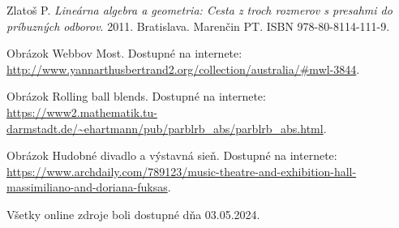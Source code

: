 \documentclass[12pt, twoside]{book}
\theoremstyle{definition}
\begin{document}
\begin{thebibliography}{99}
 Zlatoš P. \textit{Lineárna algebra a geometria: Cesta z troch rozmerov s presahmi do príbuzných odborov}. 2011. Bratislava. Marenčin PT. ISBN 978-80-8114-111-9.

 Obrázok Webbov Most. Dostupné na internete: \url{http://www.yannarthusbertrand2.org/collection/australia/#mwl-3844}.

 Obrázok Rolling ball blends. Dostupné na internete:  \url{https://www2.mathematik.tu-darmstadt.de/~ehartmann/pub/parblrb_abs/parblrb_abs.html}.

 Obrázok Hudobné divadlo a výstavná sieň. Dostupné na internete:  \url{https://www.archdaily.com/789123/music-theatre-and-exhibition-hall-massimiliano-and-doriana-fuksas}.

Všetky online zdroje boli dostupné dňa 03.05.2024.








\end{thebibliography}




\newpage

%

\end{document}
